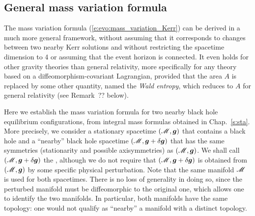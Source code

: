 \subsection{General mass variation formula} \label{s:evo:gen_mass_variation}

The mass variation formula (\ref{e:evo:mass_variation_Kerr}) can be derived in
a much more general framework, without assuming that it corresponds to changes between
two nearby Kerr solutions and without restricting
the spacetime dimension to 4 or assuming that the event horizon is connected.
It even holds for other gravity theories than general relativity, more specifically
for any theory based on a diffeomorphism-covariant Lagrangian, provided that
the area $A$ is replaced by some other quantity, named the \emph{Wald entropy}, which reduces to $A$ for general relativity (see Remark~?? below).

Here we establish the mass variation formula for two nearby black hole
equilibrium configurations, from integral mass formulas obtained in Chap.~\ref{s:sta}.
More precisely, we consider a stationary spacetime $(\mathscr{M},\bm{g})$ that contains
a black hole and a ``nearby'' black hole spacetime $(\mathscr{M},\bm{g}+\delta\bm{g})$ that has the
same symmetries (stationarity and possible axisymmetries) as $(\mathscr{M},\bm{g})$.
We shall call $(\mathscr{M},\bm{g}+\delta\bm{g})$ the ,
although we do not require that $(\mathscr{M},\bm{g}+\delta\bm{g})$ is obtained from
$(\mathscr{M},\bm{g})$ by some specific physical perturbation.
Note that the same manifold $\mathscr{M}$ is used for both spacetimes.
There is no loss of generality in doing so, since the perturbed manifold
must be diffeomorphic to the original one, which allows one to
identify the two manifolds. In particular, both manifolds have the same
topology: one would not qualify as ``nearby'' a manifold with a distinct topology.


